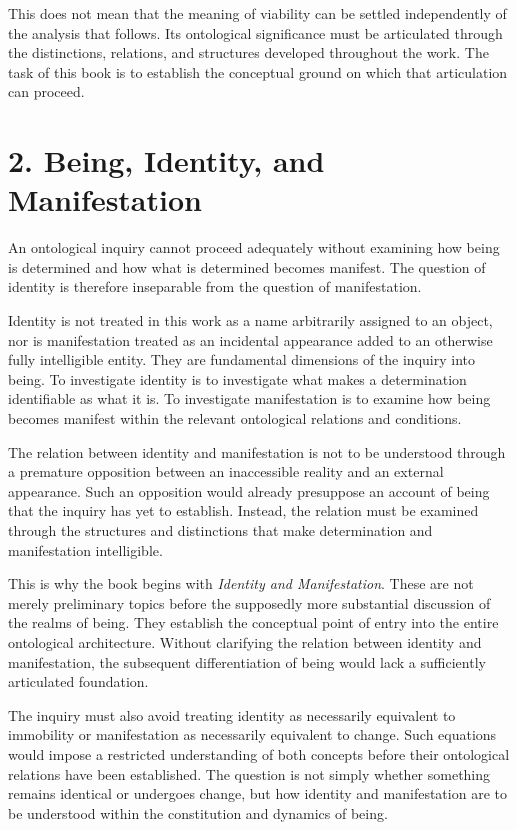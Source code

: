 This does not mean that the meaning of viability can be
settled independently of the analysis that follows. Its
ontological significance must be articulated through the
distinctions, relations, and structures developed throughout
the work. The task of this book is to establish the conceptual
ground on which that articulation can proceed.


\section*{2. Being, Identity, and Manifestation}

An ontological inquiry cannot proceed adequately without
examining how being is determined and how what is determined
becomes manifest. The question of identity is therefore
inseparable from the question of manifestation.

Identity is not treated in this work as a name arbitrarily
assigned to an object, nor is manifestation treated as an
incidental appearance added to an otherwise fully intelligible
entity. They are fundamental dimensions of the inquiry into
being. To investigate identity is to investigate what makes
a determination identifiable as what it is. To investigate
manifestation is to examine how being becomes manifest within
the relevant ontological relations and conditions.

The relation between identity and manifestation is not to
be understood through a premature opposition between an
inaccessible reality and an external appearance. Such an
opposition would already presuppose an account of being
that the inquiry has yet to establish. Instead, the relation
must be examined through the structures and distinctions
that make determination and manifestation intelligible.

This is why the book begins with
\textit{Identity and Manifestation}. These are not merely
preliminary topics before the supposedly more substantial
discussion of the realms of being. They establish the
conceptual point of entry into the entire ontological
architecture. Without clarifying the relation between
identity and manifestation, the subsequent differentiation
of being would lack a sufficiently articulated foundation.

The inquiry must also avoid treating identity as necessarily
equivalent to immobility or manifestation as necessarily
equivalent to change. Such equations would impose a
restricted understanding of both concepts before their
ontological relations have been established. The question
is not simply whether something remains identical or
undergoes change, but how identity and manifestation are
to be understood within the constitution and dynamics
of being.

